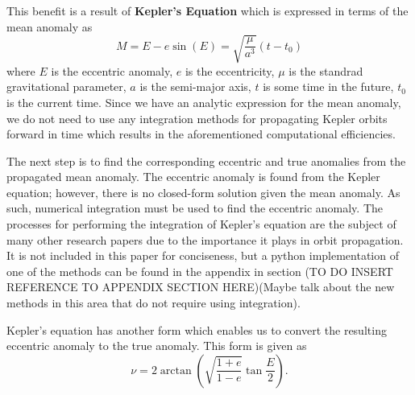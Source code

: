 \documentclass[a4paper, 12pt]{article}
\newcommand{\boldindex}[1]{%
	\textbf{#1}\index{#1}%
}
\begin{document}
This benefit is a result of \boldindex{Kepler's Equation} which is expressed in terms of the mean anomaly as
\begin{equation}
	M = E - e\sin(E) = \sqrt{\frac{\mu}{a^3}}\left(t - t_0\right)
\end{equation}
where $E$ is the eccentric anomaly, $e$ is the eccentricity, $\mu$ is the standrad gravitational parameter, $a$ is the semi-major axis, $t$ is some time in the future, $t_0$ is the current time. Since we have an analytic expression for the mean anomaly, we do not need to use any integration methods for propagating Kepler orbits forward in time which results in the aforementioned computational efficiencies.

The next step is to find the corresponding eccentric and true anomalies from the propagated mean anomaly. The eccentric anomaly is found from the Kepler equation; however, there is no closed-form solution given the mean anomaly. As such, numerical integration must be used to find the eccentric anomaly. The processes for performing the integration of Kepler's equation are the subject of many other research papers due to the importance it plays in orbit propagation. It is not included in this paper for conciseness, but a python implementation of one of the methods can be found in the appendix in section (TO DO INSERT REFERENCE TO APPENDIX SECTION HERE)(Maybe talk about the new methods in this area that do not require using integration).

Kepler's equation has another form which enables us to convert the resulting eccentric anomaly to the true anomaly. This form is given as
\begin{equation}
	\nu = 2 \arctan\left(\sqrt{\frac{1+e}{1-e}}\tan\frac{E}{2}\right).
\end{equation}
\end{document}
